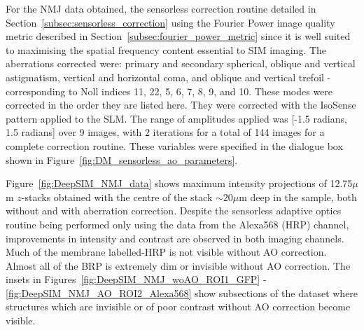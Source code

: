 For the NMJ data obtained, the sensorless correction routine detailed in 
Section~\ref{subsec:sensorless_correction} using the Fourier Power image 
quality metric described in Section~\ref{subsec:fourier_power_metric} since 
it is well suited to maximising the spatial frequency content essential to
SIM imaging. The aberrations corrected were: primary and secondary 
spherical, oblique and vertical astigmatism, vertical and horizontal coma, 
and oblique and vertical trefoil - corresponding to Noll indices 11, 22, 5, 
6, 7, 8, 9, and 10. These modes were corrected in the order they are listed
here. They were corrected with the IsoSense pattern applied to the SLM. The 
range of amplitudes applied was [-1.5 radians, 1.5 radians] over 9 images, 
with 2 iterations for a total of 144 images for a complete correction 
routine. These variables were specified in the dialogue box shown in 
Figure~\ref{fig:DM_sensorless_ao_parameters}.

Figure~\ref{fig:DeepSIM_NMJ_data} shows maximum intensity projections of 12.75$\mu$m $z$-stacks obtained with the centre of the stack $\sim20\mu$m deep in the sample, both without and with aberration correction. Despite the sensorless adaptive optics routine being performed only using the data 
from the Alexa568 (HRP) channel, improvements in intensity and contrast
are observed in both imaging channels. Much of the membrane labelled-HRP is 
not visible without AO correction. Almost all of the BRP is extremely dim 
or invisible without AO correction. The insets in 
Figures~\ref{fig:DeepSIM_NMJ_woAO_ROI1_GFP} -
\ref{fig:DeepSIM_NMJ_AO_ROI2_Alexa568} show subsections of the dataset 
where structures which are invisible or of poor contrast without AO 
correction become visible.

